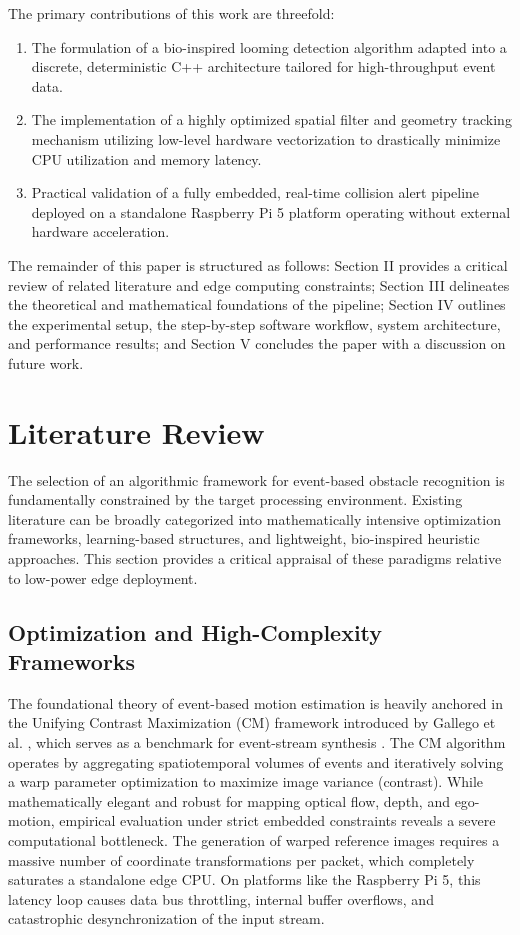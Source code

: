 \documentclass[conference]{IEEEtran}
\begin{document}
The primary contributions of this work are threefold:
\begin{enumerate}
    \item The formulation of a bio-inspired looming detection algorithm adapted into a discrete, deterministic C++ architecture tailored for high-throughput event data.
    \item The implementation of a highly optimized spatial filter and geometry tracking mechanism utilizing low-level hardware vectorization to drastically minimize CPU utilization and memory latency.
    \item Practical validation of a fully embedded, real-time collision alert pipeline deployed on a standalone Raspberry Pi 5 platform operating without external hardware acceleration.
\end{enumerate}

The remainder of this paper is structured as follows: Section II provides a critical review of related literature and edge computing constraints; Section III delineates the theoretical and mathematical foundations of the pipeline; Section IV outlines the experimental setup, the step-by-step software workflow, system architecture, and performance results; and Section V concludes the paper with a discussion on future work.
\section{Literature Review}

The selection of an algorithmic framework for event-based obstacle recognition is fundamentally constrained by the target processing environment. Existing literature can be broadly categorized into mathematically intensive optimization frameworks, learning-based structures, and lightweight, bio-inspired heuristic approaches. This section provides a critical appraisal of these paradigms relative to low-power edge deployment.

\subsection{Optimization and High-Complexity Frameworks}
The foundational theory of event-based motion estimation is heavily anchored in the Unifying Contrast Maximization (CM) framework introduced by Gallego et al. \cite{b6}, which serves as a benchmark for event-stream synthesis \cite{b3}. The CM algorithm operates by aggregating spatiotemporal volumes of events and iteratively solving a warp parameter optimization to maximize image variance (contrast). While mathematically elegant and robust for mapping optical flow, depth, and ego-motion, empirical evaluation under strict embedded constraints reveals a severe computational bottleneck. The generation of warped reference images requires a massive number of coordinate transformations per packet, which completely saturates a standalone edge CPU. On platforms like the Raspberry Pi 5, this latency loop causes data bus throttling, internal buffer overflows, and catastrophic desynchronization of the input stream.
\end{document}
